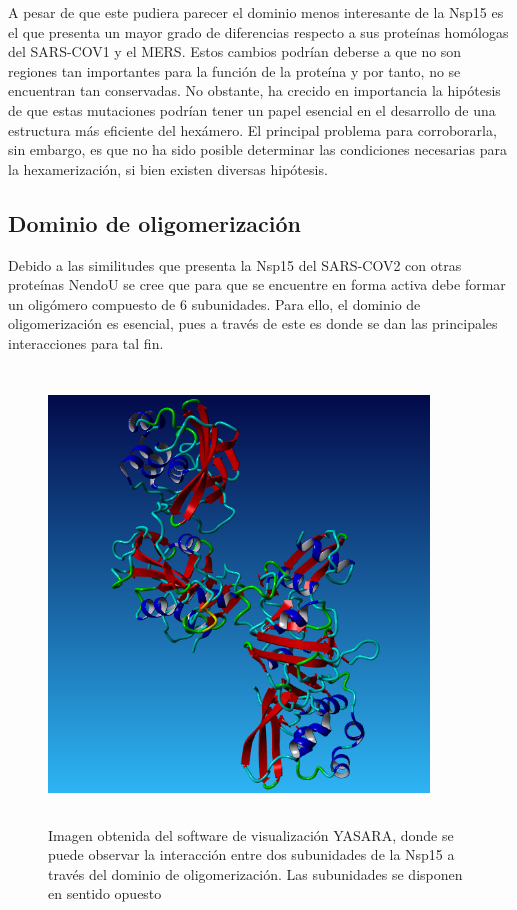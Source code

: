 \documentclass[12pt]{article}
\begin{document}
A pesar de que este pudiera parecer el dominio menos interesante de la Nsp15 es el que presenta un mayor grado de diferencias respecto a sus proteínas homólogas del SARS-COV1 y el MERS. Estos cambios podrían deberse a que no son regiones tan importantes para la función de la proteína y por tanto, no se encuentran tan conservadas. No obstante, ha crecido en importancia la hipótesis de que estas mutaciones podrían tener un papel esencial en el desarrollo de una estructura más eficiente del hexámero. El principal problema para corroborarla, sin embargo, es que no ha sido posible determinar las condiciones necesarias para la hexamerización, si bien existen diversas hipótesis.

\subsection{Dominio de oligomerización}
Debido a las similitudes que presenta la Nsp15 del SARS-COV2 con otras proteínas NendoU se cree que para que se encuentre en forma activa debe formar un oligómero compuesto de 6 subunidades. Para ello, el dominio de oligomerización es esencial, pues a través de este es donde se dan las principales interacciones para tal fin.

\begin{figure}[H]
\centering
\includegraphics[width=0.9\textwidth, height=12cm]{Screenshot_11}
\caption{Imagen obtenida del software de visualización YASARA, donde se puede observar la interacción entre dos subunidades de la Nsp15 a través del dominio de oligomerización. Las subunidades se disponen en sentido opuesto}
\end{figure}
\end{document}

